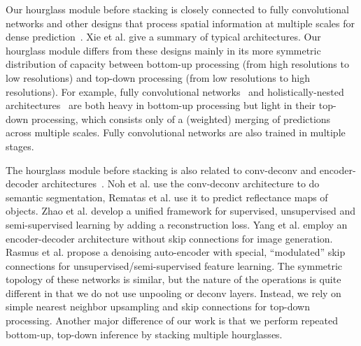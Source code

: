 \documentclass[runningheads]{llncs}
\begin{document}
Our hourglass module before stacking is closely connected to fully
convolutional networks \cite{long2015fully} and other designs that
process spatial information at multiple scales for dense
prediction~\cite{tompson2014joint, xie2015holistically,
  eigen2014depth, farabet2013learning, pinheiro2014recurrent,
  eigen2015predicting, mathieu2015deep, couprie2013indoor,
  bertasius2015deepedge, hariharan2015hypercolumns}. Xie et
al. \cite{xie2015holistically} give a summary of typical
architectures. Our hourglass module differs from these designs mainly
in its more symmetric distribution of capacity between bottom-up
processing (from high resolutions to low resolutions) and top-down
processing (from low resolutions to high resolutions). For example,
fully convolutional networks~\cite{long2015fully} and
holistically-nested architectures~\cite{xie2015holistically} are both
heavy in bottom-up processing but light in their top-down processing,
which consists only of a (weighted) merging of predictions across
multiple scales. Fully convolutional networks are also trained in
multiple stages.

The hourglass module before stacking is also related to conv-deconv
and encoder-decoder architectures~\cite{noh2015learning,
  zhao2015stacked, rematas2015deep, badrinarayanan2015segnet}.  Noh et
al. \cite{noh2015learning} use the conv-deconv architecture to do
semantic segmentation, Rematas et al. \cite{rematas2015deep} use it to
predict reflectance maps of objects. Zhao et
al. \cite{zhao2015stacked} develop a unified framework for supervised,
unsupervised and semi-supervised learning by adding a reconstruction
loss. Yang et al. \cite{yang2015nips} employ an encoder-decoder
architecture without skip connections for image generation. Rasmus et
al. \cite{rasmus2015semi} propose a denoising auto-encoder with
special, ``modulated'' skip connections for
unsupervised/semi-supervised feature learning.  The symmetric topology
of these networks is similar, but the nature of the operations is
quite different in that we do not use unpooling or deconv
layers. Instead, we rely on simple nearest neighbor upsampling and
skip connections for top-down processing. Another major difference of
our work is that we perform repeated bottom-up, top-down inference by
stacking multiple hourglasses.

\end{document}
